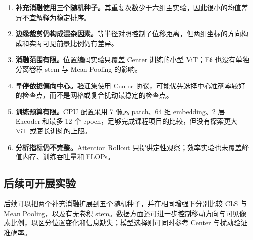 \begin{enumerate}
  \item \textbf{补充消融使用三个随机种子。}其重复次数少于六组主实验，因此很小的均值差异不宜解释为稳定排序。
  \item \textbf{边缘裁剪仍构成混杂因素。}等半径对照控制了位移距离，但两组坐标的方向构成和实际可见前景比例仍有差异。
  \item \textbf{消融范围有限。}位置编码实验只覆盖 Center 训练的小型 ViT；E6 也没有单独分离卷积 stem 与 Mean Pooling 的影响。
  \item \textbf{早停依据偏向中心。}验证集使用 Center 协议，可能优先选择中心准确率较好的检查点，而不是网格或复合扰动最稳定的检查点。
  \item \textbf{训练预算有限。}CPU 配置采用 7 像素 patch、64 维 embedding、2 层 Encoder 和最多 12 个 epoch，足够完成课程项目的比较，但没有探索更大 ViT 或更长训练的上限。
  \item \textbf{分析指标仍不完整。}Attention Rollout 只提供定性观察；效率实验也未覆盖峰值内存、训练吞吐量和 FLOPs。
\end{enumerate}

\subsection{后续可开展实验}

后续可以把两个补充消融扩展到五个随机种子，并在相同增强下分别比较 CLS 与 Mean Pooling，以及有无卷积 stem。数据方面还可进一步控制移动方向与可见像素比例，以区分位置变化和信息缺失；模型选择则可同时参考 Center 与扰动验证准确率。
